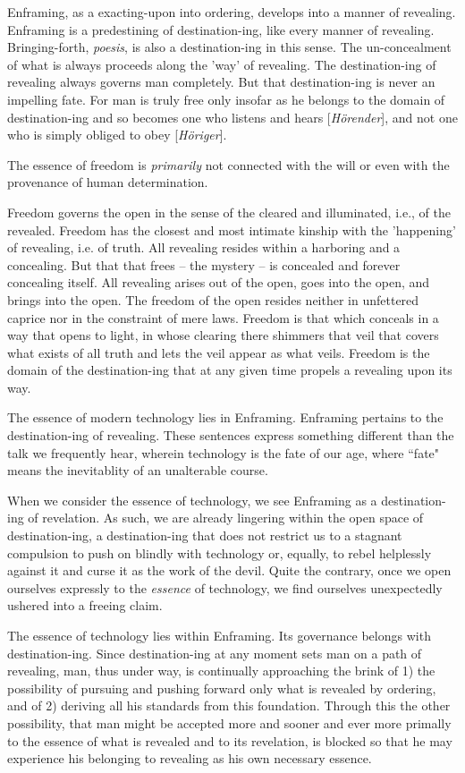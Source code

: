 \documentclass[12pt]{article}
\begin{document}
Enframing, as a exacting-upon into ordering, develops into a manner of revealing. Enframing is a predestining of destination-ing, like every manner of revealing. Bringing-forth, \textit{po{\-e}sis}, is also a destination-ing in this sense. The un-concealment of what is always proceeds along the 'way' of revealing. The destination-ing of revealing always governs man completely. But that destination-ing is never an impelling fate. For man is truly free only insofar as he belongs to the domain of destination-ing and so becomes one who listens and hears [\textit{H{\"o}render}], and not one who is simply obliged to obey [\textit{H{\"o}riger}].

The essence of freedom is \textit{primarily} not connected with the will or even with the provenance of human determination.

Freedom governs the open in the sense of the cleared and illuminated, i.e., of the revealed. Freedom has the closest and most intimate kinship with the 'happening' of revealing, i.e. of truth. All revealing resides within a harboring and a concealing. But that that frees -- the mystery -- is concealed and forever concealing itself. All revealing arises out of the open, goes into the open, and brings into the open. The freedom of the open resides neither in unfettered caprice nor in the constraint of mere laws. Freedom is that which conceals in a way that opens to light, in whose clearing there shimmers that veil that covers what exists of all truth and lets the veil appear as what veils. Freedom is the domain of the destination-ing that at any given time propels a revealing upon its way.

The essence of modern technology lies in Enframing. Enframing pertains to the destination-ing of revealing. These sentences express something different than the talk we frequently hear, wherein technology is the fate of our age, where ``fate" means the inevitablity of an unalterable course.

When we consider the essence of technology, we see Enframing as a destination-ing of revelation. As such, we are already lingering within the open space of destination-ing, a destination-ing that does not restrict us to a stagnant compulsion to push on blindly with technology or, equally, to rebel helplessly against it and curse it as the work of the devil. Quite the contrary, once we open ourselves expressly to the \textit{essence} of technology, we find ourselves unexpectedly ushered into a freeing claim.

The essence of technology lies within Enframing. Its governance belongs with destination-ing. Since destination-ing at any moment sets man on a path of revealing, man, thus under way, is continually approaching the brink of 1) the possibility of pursuing and pushing forward only what is revealed by ordering, and of 2) deriving all his standards from this foundation. Through this the other possibility, that man might be accepted more and sooner and ever more primally to the essence of what is revealed and to its revelation, is blocked so that he may experience his belonging to revealing as his own necessary essence.
\end{document}
